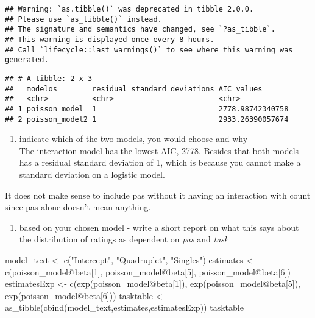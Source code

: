 \documentclass[
]{article}
\newenvironment{Shaded}{\begin{snugshade}}{\end{snugshade}}
\newcommand{\DecValTok}[1]{\textcolor[rgb]{0.00,0.00,0.81}{#1}}
\newcommand{\FunctionTok}[1]{\textcolor[rgb]{0.00,0.00,0.00}{#1}}
\newcommand{\NormalTok}[1]{#1}
\newcommand{\OtherTok}[1]{\textcolor[rgb]{0.56,0.35,0.01}{#1}}
\newcommand{\SpecialCharTok}[1]{\textcolor[rgb]{0.00,0.00,0.00}{#1}}
\newcommand{\StringTok}[1]{\textcolor[rgb]{0.31,0.60,0.02}{#1}}
\providecommand{\tightlist}{%
  \setlength{\itemsep}{0pt}\setlength{\parskip}{0pt}}
\begin{document}
\begin{verbatim}
## Warning: `as.tibble()` was deprecated in tibble 2.0.0.
## Please use `as_tibble()` instead.
## The signature and semantics have changed, see `?as_tibble`.
## This warning is displayed once every 8 hours.
## Call `lifecycle::last_warnings()` to see where this warning was generated.
\end{verbatim}

\begin{verbatim}
## # A tibble: 2 x 3
##   modelos        residual_standard_deviations AIC_values      
##   <chr>          <chr>                        <chr>           
## 1 poisson_model  1                            2778.98742340758
## 2 poisson_model2 1                            2933.26390057674
\end{verbatim}

\begin{enumerate}
\def\labelenumi{\alph{enumi}.}
\setcounter{enumi}{21}
\tightlist
\item
  indicate which of the two models, you would choose and why\\
  The interaction model has the lowest AIC, 2778. Besides that both
  models has a residual standard deviation of 1, which is because you
  cannot make a standard deviation on a logistic model.
\end{enumerate}

It does not make sense to include pas without it having an interaction
with count since pas alone doesn't mean anything.

\begin{enumerate}
\def\labelenumi{\roman{enumi}.}
\setcounter{enumi}{5}
\tightlist
\item
  based on your chosen model - write a short report on what this says
  about the distribution of ratings as dependent on \emph{pas} and
  \emph{task}
\end{enumerate}

\begin{Shaded}
\begin{Highlighting}[]
\NormalTok{model\_text }\OtherTok{\textless{}{-}} \FunctionTok{c}\NormalTok{(}\StringTok{"Intercept"}\NormalTok{, }\StringTok{"Quadruplet"}\NormalTok{, }\StringTok{"Singles"}\NormalTok{)}
\NormalTok{estimates }\OtherTok{\textless{}{-}} \FunctionTok{c}\NormalTok{(poisson\_model}\SpecialCharTok{@}\NormalTok{beta[}\DecValTok{1}\NormalTok{], poisson\_model}\SpecialCharTok{@}\NormalTok{beta[}\DecValTok{5}\NormalTok{], poisson\_model}\SpecialCharTok{@}\NormalTok{beta[}\DecValTok{6}\NormalTok{])}
\NormalTok{estimatesExp }\OtherTok{\textless{}{-}} \FunctionTok{c}\NormalTok{(}\FunctionTok{exp}\NormalTok{(poisson\_model}\SpecialCharTok{@}\NormalTok{beta[}\DecValTok{1}\NormalTok{]), }\FunctionTok{exp}\NormalTok{(poisson\_model}\SpecialCharTok{@}\NormalTok{beta[}\DecValTok{5}\NormalTok{]), }\FunctionTok{exp}\NormalTok{(poisson\_model}\SpecialCharTok{@}\NormalTok{beta[}\DecValTok{6}\NormalTok{]))}
\NormalTok{tasktable }\OtherTok{\textless{}{-}} \FunctionTok{as\_tibble}\NormalTok{(}\FunctionTok{cbind}\NormalTok{(model\_text,estimates,estimatesExp))}
\NormalTok{tasktable}
\end{Highlighting}
\end{Shaded}
\end{document}
